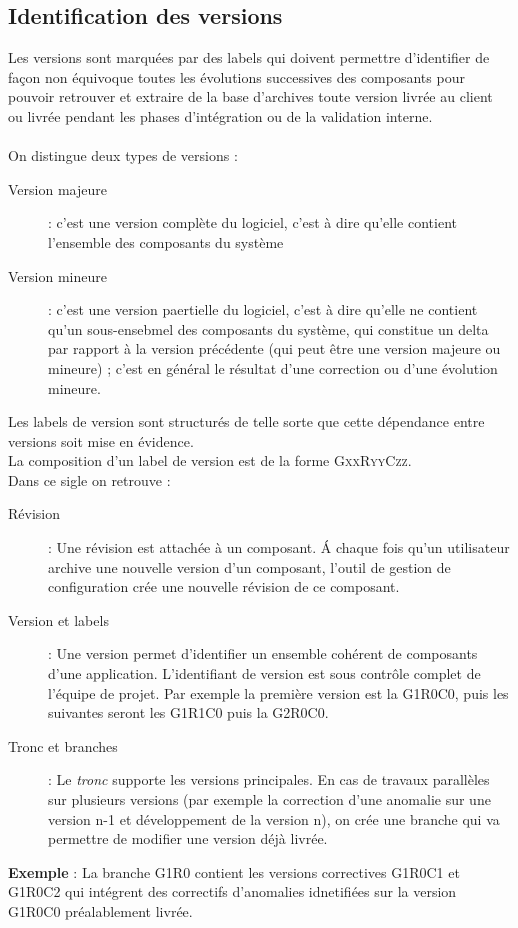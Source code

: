 \subsection{Identification des versions}
\label{versionning}
Les versions sont marquées par des labels qui doivent permettre d'identifier de façon non équivoque toutes les évolutions successives des composants pour pouvoir retrouver et extraire de la base d'archives toute version livrée au client ou livrée pendant les phases d'intégration ou de la validation interne.
\\\\
On distingue deux types de versions :
\begin{description}
	\item[Version majeure] : c'est une version complète du logiciel, c'est à dire qu'elle contient l'ensemble des composants du système
	\item[Version mineure] : c'est une version paertielle du logiciel, c'est à dire qu'elle ne contient qu'un sous-ensebmel des composants du système, qui constitue un delta par rapport à la version précédente
	(qui peut être une version majeure ou mineure) ; c'est en général le résultat d'une correction ou d'une évolution mineure.
\end{description}
Les labels de version sont structurés de telle sorte que cette dépendance entre versions soit mise en évidence.
\\La composition d'un label de version est de la forme \textsc{GxxRyyCzz}.
\\Dans ce sigle on retrouve :
\begin{description}
	\item[Révision] : Une révision est attachée à un composant. \'A chaque fois qu'un utilisateur archive une nouvelle version d'un composant, l'outil de gestion de configuration crée une nouvelle révision de ce composant.
	\item[Version et labels] : Une version permet d'identifier un ensemble cohérent de composants d'une application. L'identifiant de version est sous contrôle complet de l'équipe de projet. Par exemple la première version est la G1R0C0, puis les suivantes seront les
	G1R1C0 puis la G2R0C0.
	\item[Tronc et branches] : Le \textit{tronc} supporte les versions principales. En cas de travaux parallèles sur plusieurs versions (par exemple la correction d'une anomalie sur une version n-1 et développement de la version n), on crée une branche qui va permettre de modifier une version déjà livrée.
	\\
\end{description}
\textbf{Exemple} : La branche G1R0 contient les versions correctives G1R0C1 et G1R0C2 qui intégrent des correctifs d'anomalies idnetifiées sur la version G1R0C0 préalablement livrée.
\setlength{\unitlength}{1.3cm}

